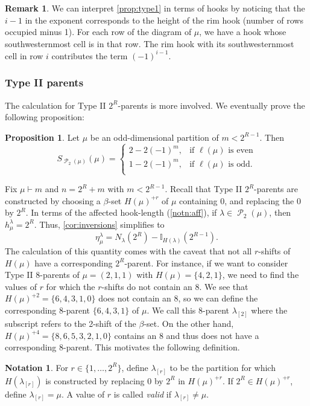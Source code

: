 \documentclass[12pt]{amsart}
\theoremstyle{definition}
\newtheorem{notation}[theorem]{Notation}
\newtheorem{remark}[theorem]{Remark}
\newtheorem{proposition}[theorem]{Proposition}
\numberwithin{equation}{section}
\newcommand{\la}{\lambda}
\DeclareMathOperator{\p}{\mathcal{P}}
\begin{document}
\begin{remark}
    We can interpret \cref{prop:type1} in terms of hooks by noticing that the $i-1$ in the exponent corresponds to the height of the rim hook (number of rows occupied minus 1). For each row of the diagram of $\mu$, we have a hook whose southwesternmost cell is in that row. The rim hook with its southwesternmost cell in row $i$ contributes the term $(-1)^{i-1}$.
\end{remark}
\subsubsection{Type II parents}
The calculation for Type II $2^R$-parents is more involved. We eventually prove the following proposition:
\begin{proposition}\label{prop:type2}
Let $\mu$ be an odd-dimensional partition of $m< 2^{R-1}$. Then
\[
S_{\p_2(\mu)}(\mu) = \begin{cases}
2 - 2(-1)^{m}, &\text{if } \ell(\mu) \text{ is even}\\
1 - 2(-1)^{m}, & \text{if } \ell(\mu) \text{ is odd}.\\
\end{cases}
\]
\end{proposition}

Fix $\mu\vdash m$ and $n = 2^R + m$ with $m < 2^{R-1}$. Recall that Type II $2^R$-parents are constructed by choosing a $\beta$-set $H(\mu)^{+r}$ of $\mu$ containing 0, and replacing the 0 by $2^R$. In terms of the affected hook-length (\cref{notn:aff}), if $\lambda\in\p_2(\mu)$, then $h^\lambda_\mu = 2^R$. Thus, \cref{cor:inversions} simplifies to 
\begin{equation}\label{eq:etatypeii}
    \eta^\lambda_\mu = N_{\lambda}(2^R) - \mathbb{I}_{H(\lambda)}(2^{R-1}).
\end{equation} The calculation of this quantity comes with the caveat that not all $r$-shifts of $H(\mu)$ have a corresponding $2^R$-parent. For instance, if we want to consider Type II 8-parents of $\mu = (2,1,1)$ with $H(\mu) = \{4,2,1\}$, we need to find the values of $r$ for which the $r$-shifts do not contain an 8. We see that $H(\mu)^{+2} = \{6,4,3,1,0\}$ does not contain an 8, so we can define the corresponding 8-parent $\{6,4,3,1\}$ of $\mu$. We call this 8-parent $\lambda_{[2]}$ where the subscript refers to the 2-shift of the $\beta$-set. On the other hand, $H(\mu)^{+4} = \{8,6,5,3,2,1,0\}$ contains an 8 and thus does not have a corresponding 8-parent. This motivates the following definition.
\begin{notation}\label{notn:valid-values}
For $r \in \{1,\ldots, 2^R\}$, define $\lambda_{[r]}$ to be the partition for which $H(\la_{[r]})$ is constructed by replacing 0 by $2^R$ in $H(\mu)^{+r}$. If $2^R\in H(\mu)^{+r}$, define $\lambda_{[r]} =\mu$. A value of $r$ is called \textit{valid} if $\lambda_{[r]} \neq \mu$.
\end{notation}
\end{document}
